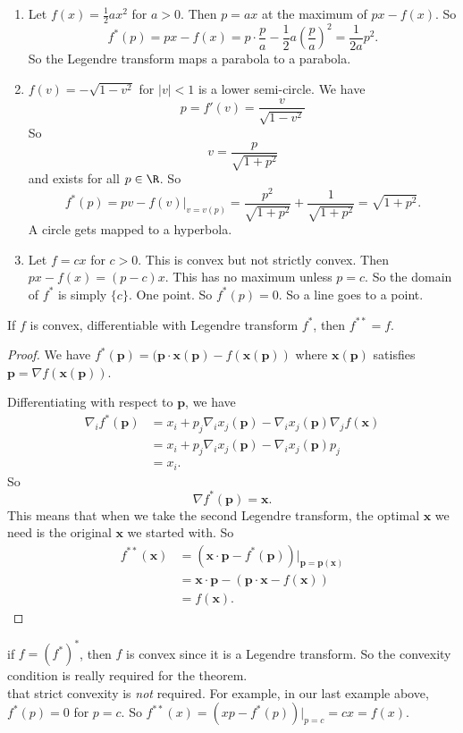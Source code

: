 \documentclass[a4paper]{article}
\begin{document}
\begin{eg}\leavevmode
  \begin{enumerate}
    \item Let $f(x) = \frac{1}{2}ax^2$ for $a > 0$. Then $p = ax$ at the maximum of $px - f(x)$. So
      \[
        f^*(p) = px - f(x) = p\cdot \frac{p}{a} - \frac{1}{2}a\left(\frac{p}{a}\right)^2 = \frac{1}{2a}p^2.
      \]
      So the Legendre transform maps a parabola to a parabola.
    \item $f(v) = -\sqrt{1 - v^2}$ for $|v| < 1$ is a lower semi-circle. We have
      \[
        p = f'(v) = \frac{v}{\sqrt{1 - v^2}}
      \]
      So
      \[
        v = \frac{p}{\sqrt{1 + p^2}}
      \]
      and exists for all $p\in \R$. So
      \[
        f^*(p) = pv - f(v)|_{v = v(p)} = \frac{p^2}{\sqrt{1 + p^2}} + \frac{1}{\sqrt{1 + p^2}} = \sqrt{1 + p^2}.
      \]
      A circle gets mapped to a hyperbola.
    \item Let $f = cx$ for $c > 0$. This is convex but not strictly convex. Then $px - f(x) = (p - c)x$. This has no maximum unless $p = c$. So the domain of $f^*$ is simply $\{c\}$. One point. So $f^*(p) = 0$. So a line goes to a point.
  \end{enumerate}
\end{eg}
\begin{thm}
  If $f$ is convex, differentiable with Legendre transform $f^*$, then $f^{**} = f$.
\end{thm}

\begin{proof}
  We have $f^*(\mathbf{p}) = (\mathbf{p}\cdot\mathbf{x}(\mathbf{p}) - f(\mathbf{x}(\mathbf{p}))$ where $\mathbf{x}(\mathbf{p})$ satisfies $\mathbf{p} = \nabla f(\mathbf{x}(\mathbf{p}))$.

  Differentiating with respect to $\mathbf{p}$, we have
  \begin{align*}
    \nabla_i f^*(\mathbf{p}) &= x_i + p_j \nabla_i x_j (\mathbf{p}) - \nabla_i x_j(\mathbf{p}) \nabla_j f(\mathbf{x})\\
    &= x_i + p_j \nabla_i x_j(\mathbf{p}) - \nabla_i x_j(\mathbf{p}) p_j\\
    &= x_i.
  \end{align*}
  So
  \[
    \nabla f^*(\mathbf{p}) = \mathbf{x}.
  \]
  This means that when we take the second Legendre transform, the optimal $\mathbf{x}$ we need is the original $\mathbf{x}$ we started with. So
  \begin{align*}
    f^{**}(\mathbf{x}) &= (\mathbf{x} \cdot \mathbf{p} - f^*(\mathbf{p}))|_{\mathbf{p} = \mathbf{p}(\mathbf{x})}\\
    &= \mathbf{x}\cdot \mathbf{p} - (\mathbf{p}\cdot \mathbf{x} - f(\mathbf{x}))\\
    &= f(\mathbf{x}).
  \end{align*}
\end{proof}
\note if $f = (f^*)^*$, then $f$ is convex since it is a Legendre transform. So the convexity condition is really required for the theorem.\\
\note that strict convexity is \emph{not} required. For example, in our last example above, $f^*(p) = 0$ for $p = c$. So $f^{**}(x) = (xp - f^*(p))|_{p = c} = cx = f(x)$.
\end{document}
